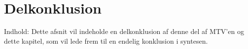 \section{Delkonklusion}
Indhold: Dette afsnit vil indeholde en delkonklusion af denne del af MTV'en og dette kapitel, som vil lede frem til en endelig konklusion i syntesen. 